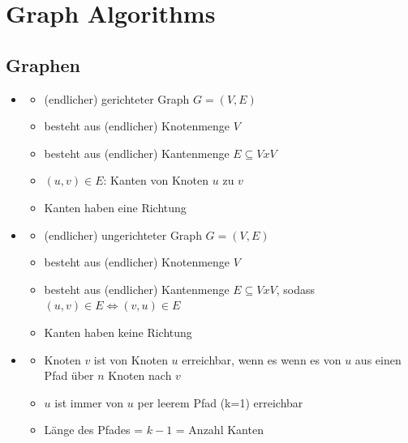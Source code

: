 \documentclass[
    12pt,
    a4paper,
    ngerman,
    color=3b,%
    marginpar=false,
    colorback=false,
    leqno,
]{tudaexercise}
\begin{document}
\section{Graph Algorithms}
\subsection{Graphen}
    \begin{itemize}
        \item {}
            \begin{itemize}
                \item (endlicher) gerichteter Graph $G = (V,E)$
                \item besteht aus (endlicher) Knotenmenge $V$
                \item besteht aus (endlicher) Kantenmenge $E \subseteq V x V$
                \item $(u,v) \in E$: Kanten von Knoten $u$ zu $v$
                \item Kanten haben eine Richtung
            \end{itemize}

        \item {}
            \begin{itemize}
                \item (endlicher) ungerichteter Graph $G = (V,E)$
                \item besteht aus (endlicher) Knotenmenge $V$
                \item besteht aus (endlicher) Kantenmenge $E \subseteq V x V$, sodass $(u,v) \in E \Leftrightarrow (v,u) \in E$
                \item Kanten haben keine Richtung
            \end{itemize}

        \item {}
            \begin{itemize}
                \item Knoten $v$ ist von Knoten $u$ erreichbar, wenn es wenn es von $u$ aus einen Pfad über $n$ Knoten nach $v$
                \item $u$ ist immer von $u$ per leerem Pfad (k=1) erreichbar
                \item Länge des Pfades = $k - 1$ = Anzahl Kanten
            \end{itemize}


\end{itemize}
\end{document}
